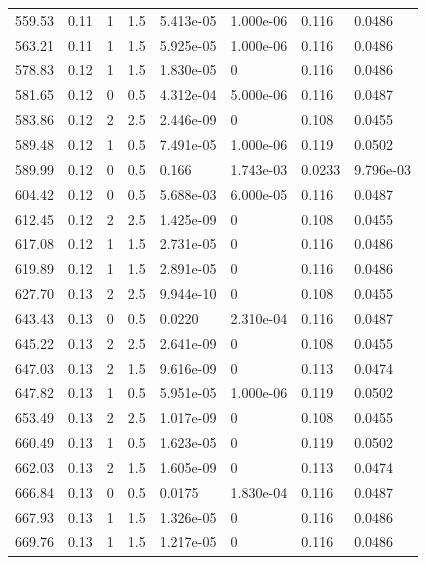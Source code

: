 \documentclass[preview]{standalone}
\begin{document}
{{{\begin{tabular}{L{1.2cm}C{1.2cm} C{0.3cm}C{0.5cm} C{1.4cm}C{1.4cm} C{1.4cm}C{1.4cm}}
  559.53  &  0.11  & 1     & 1.5 &  5.413e-05  & 1.000e-06  & 0.116 &  0.0486   \\ 
  563.21  &  0.11  & 1     & 1.5 &  5.925e-05  & 1.000e-06  & 0.116 &  0.0486   \\ 
  578.83  &  0.12  & 1     & 1.5 &  1.830e-05  & 0  & 0.116 &  0.0486   \\ 
  581.65  &  0.12  & 0     & 0.5 &  4.312e-04  & 5.000e-06  & 0.116 &  0.0487   \\ 
  583.86  &  0.12  & 2     & 2.5 &  2.446e-09  & 0  & 0.108 &  0.0455   \\ 
  589.48  &  0.12  & 1     & 0.5 &  7.491e-05  & 1.000e-06  & 0.119 &  0.0502   \\ 
  589.99  &  0.12  & 0     & 0.5 &  0.166  & 1.743e-03  & 0.0233 &  9.796e-03   \\ 
  604.42  &  0.12  & 0     & 0.5 &  5.688e-03  & 6.000e-05  & 0.116 &  0.0487   \\ 
  612.45  &  0.12  & 2     & 2.5 &  1.425e-09  & 0  & 0.108 &  0.0455   \\ 
  617.08  &  0.12  & 1     & 1.5 &  2.731e-05  & 0  & 0.116 &  0.0486   \\ 
  619.89  &  0.12  & 1     & 1.5 &  2.891e-05  & 0  & 0.116 &  0.0486   \\ 
  627.70  &  0.13  & 2     & 2.5 &  9.944e-10  & 0  & 0.108 &  0.0455   \\ 
  643.43  &  0.13  & 0     & 0.5 &  0.0220  & 2.310e-04  & 0.116 &  0.0487   \\ 
  645.22  &  0.13  & 2     & 2.5 &  2.641e-09  & 0  & 0.108 &  0.0455   \\ 
  647.03  &  0.13  & 2     & 1.5 &  9.616e-09  & 0  & 0.113 &  0.0474   \\ 
  647.82  &  0.13  & 1     & 0.5 &  5.951e-05  & 1.000e-06  & 0.119 &  0.0502   \\ 
  653.49  &  0.13  & 2     & 2.5 &  1.017e-09  & 0  & 0.108 &  0.0455   \\ 
  660.49  &  0.13  & 1     & 0.5 &  1.623e-05  & 0  & 0.119 &  0.0502   \\ 
  662.03  &  0.13  & 2     & 1.5 &  1.605e-09  & 0  & 0.113 &  0.0474   \\ 
  666.84  &  0.13  & 0     & 0.5 &  0.0175  & 1.830e-04  & 0.116 &  0.0487   \\ 
  667.93  &  0.13  & 1     & 1.5 &  1.326e-05  & 0  & 0.116 &  0.0486   \\ 
  669.76  &  0.13  & 1     & 1.5 &  1.217e-05  & 0  & 0.116 &  0.0486   \\ 

\end{tabular}}}}
\end{document}
